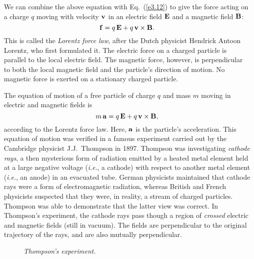 We can combine the above equation with Eq.~(\ref{e3.12}) to give the force acting on a charge $q$ moving
with velocity ${\bf v}$ in an electric field ${\bf E}$ and a magnetic field
${\bf B}$:
\begin{equation}
{\bf f} = q\,{\bf E} + q\,{\bf v} \times{\bf B}.
\end{equation}
This is called the {\em Lorentz force law}, after the Dutch physicist
Hendrick Antoon Lorentz, who first formulated it. The electric
force on a charged particle is parallel to the local electric field.
The magnetic force, however, is perpendicular to both the local magnetic
field and the particle's direction of motion. No magnetic force is exerted on a
stationary charged particle.

The
equation of motion of a free particle of charge $q$ and
mass $m$ moving in electric and
magnetic fields is
\begin{equation} 
m\,{\bf a} = q\,{\bf E} + q\,{\bf v} \times{\bf B},
\end{equation}
according to the Lorentz force law. Here, ${\bf a}$ is the
particle's acceleration.
This equation of motion was verified in a famous experiment carried out
by the Cambridge physicist J.J.~Thompson in 1897. Thompson was investigating
{\em cathode rays}, a then mysterious form of radiation emitted by a heated
metal element held at a large negative voltage ({\em i.e.},  a cathode) with respect
to another metal element ({\em i.e.}, an anode)  in an evacuated tube. 
German physicists maintained that cathode rays were
a form of electromagnetic radiation, whereas British and French physicists suspected
that they were, in reality, a stream of charged particles. Thompson was able to
demonstrate that the latter view was correct. In Thompson's experiment, the
cathode rays pass though a region of {\em crossed}\/ electric and magnetic
fields (still in vacuum). The fields are perpendicular to the original
trajectory of the rays, and are also mutually perpendicular.

\begin{figure}
\epsfysize=2.5in
\centerline{}
\caption{\em Thompson's experiment.}\label{f8.4}
\end{figure}

